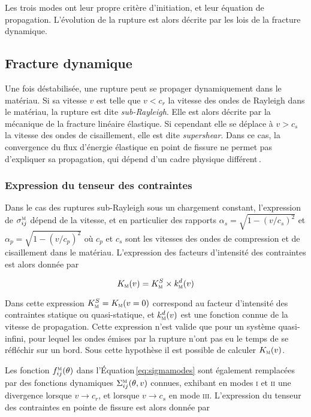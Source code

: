 Les trois modes ont leur propre critère d'initiation, et leur équation de propagation. L'évolution de la rupture est alors décrite par les lois de la fracture dynamique.


\subsection{Fracture dynamique}





Une fois déstabilisée, une rupture peut se propager dynamiquement dans le matériau. Si sa vitesse $v$ est telle que $v<c_r$ la vitesse des ondes de Rayleigh dans le matériau, la rupture est dite \textit{sub-Rayleigh}. Elle est alors décrite par la mécanique de la fracture linéaire élastique. Si cependant elle se déplace à $v>c_s$ la vitesse des ondes de cisaillement, elle est dite \textit{supershear}. Dans ce cas, la convergence du flux d'énergie élastique en point de fissure ne permet pas d'expliquer sa propagation, qui dépend d'un cadre physique différent\,\cite{dunham_supershear_2003}.

\subsubsection{Expression du tenseur des contraintes}


Dans le cas des ruptures sub-Rayleigh sous un chargement constant, l'expression de $\sigma_{ij}^\textsc{m}$ dépend de la vitesse, et en particulier des rapports $\alpha_s =\sqrt{ 1-(v/c_s)^2}$ et $\alpha_p =\sqrt{ 1-(v/c_p)^2}$ où $c_p$ et $c_s$ sont les vitesses des ondes de compression et de cisaillement dans le matériau. L'expression des facteurs d'intensité des contraintes est alors donnée par

\begin{equation}
K_\textsc{m}(v)=K_\textsc{m}^S\times k_\textsc{m}^d(v)
\end{equation}

Dans cette expression $K_\textsc{m}^S = K_\textsc{m}(v=0)$ correspond au facteur d'intensité des contraintes statique ou quasi-statique, et $k_\textsc{m}^d(v)$ est une fonction connue de la vitesse de propagation. Cette expression n'est valide que pour un système quasi-infini, pour lequel les ondes émises par la rupture n'ont pas eu le temps de se réfléchir sur un bord. Sous cette hypothèse il est possible de calculer $K_\textsc{m}(v)$.

Les fonction $f_{ij}^\textsc{m}(\theta)$ dans l'Équation\,\ref{eq:sigmamodes} sont également remplacées par des fonctions dynamiques $\Sigma_{ij}^\textsc{m}(\theta,v)$ connues, exhibant en modes \textsc{i} et \textsc{ii} une divergence lorsque $v\rightarrow c_r$, et lorsque $v\rightarrow c_s$ en mode \textsc{iii}. L'expression du tenseur des contraintes en pointe de fissure est alors donnée par\,\cite{sun_fracture_2012}


